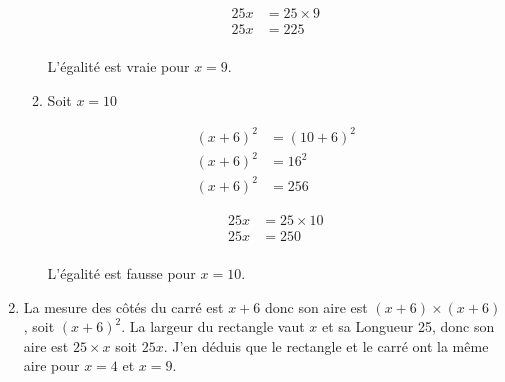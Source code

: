 \documentclass[12pt,a4paper]{article}
\begin{document}
\begin{enumerate}[label=\arabic*)]
\begin{enumerate}[label=\alph*)]
\begin{multicols}{2}
			\begin{align*}
				25x &= 25 \times 9\\ 
				25x &= 225\\
			\end{align*}
		\end{multicols}
	
		L'égalité est vraie pour $x=9$.
		\item Soit $x=10$
		
		\begin{multicols}{2}
			\begin{align*}
				(x + 6)^2 &= (10 + 6)^2\\ 
				(x + 6)^2 &= 16^2\\ 
				(x + 6)^2 &= 256
			\end{align*}
			
			\begin{align*}
				25x &= 25 \times 10\\ 
				25x &= 250\\
			\end{align*}
		\end{multicols}
	
		L'égalité est fausse pour $x=10$.
	\end{enumerate}
	
	\item La mesure des côtés du carré est $x+6$ donc son aire est $(x+6)\times (x+6)$, soit $(x+6)^2$. La largeur du rectangle vaut $x$ et sa Longueur 25, donc son aire est $25 \times x$ soit $25x$. J'en déduis que le rectangle et le carré ont la même aire pour $x=4$ et $x=9$.
	\end{enumerate}
\end{document}
